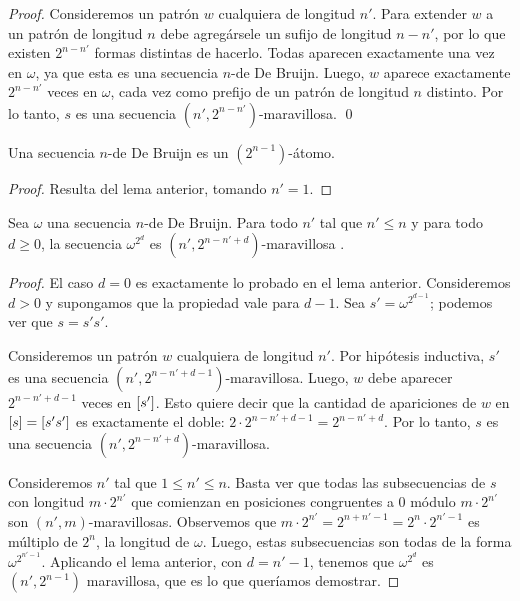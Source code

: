 \documentclass[11pt]{article}
\begin{document}

\begin{proof}
	Consideremos un patrón $w$ cualquiera de longitud $n'$. Para extender $w$ a
	un patrón de longitud $n$ debe agregársele un sufijo de longitud $n-n'$, por
	lo que existen $2^{n-n'}$ formas distintas de hacerlo. Todas
	aparecen exactamente una vez en $\omega$, ya que esta es
	una secuencia $n$-de De Bruijn. Luego, $w$ aparece exactamente $2^{n-n'}$
	veces en $\omega$, cada vez como prefijo de un patrón de longitud $n$
	distinto. Por lo tanto, $s$ es una secuencia $(n',2^{n-n'})$-maravillosa.
	\qed
\end{proof}

\begin{corollary}
	Una secuencia $n$-de De Bruijn es un $(2^{n-1})$-átomo.
\end{corollary}

\begin{proof}
	Resulta del lema anterior, tomando $n' = 1$.
\end{proof}


\begin{lema}
	Sea $\omega$ una secuencia $n$-de De Bruijn.
	Para todo $n'$ tal que $n' \leq n$ y para todo $d \geq 0$, la
	secuencia $\omega^{2^d}$ es $(n',2^{n-n'+d})$-maravillosa .

\end{lema}

\begin{proof}
	El caso $d = 0$ es exactamente lo probado en el lema anterior.
	Consideremos $d > 0$ y supongamos que la propiedad vale para $d - 1$.
	Sea $s' = \omega^{2^{d-1}}$; podemos ver que $s = s's'$.

	Consideremos un patrón $w$ cualquiera de longitud $n'$. Por hipótesis
	inductiva, $s'$ es una secuencia $(n',2^{n-n'+d-1})$-maravillosa. Luego, $w$
	debe aparecer $2^{n-n'+d-1}$ veces en $\left[s'\right]$.
	Esto quiere decir que la cantidad de apariciones de $w$ en $\left[s\right] =
		\left[s's'\right]$ es exactamente el doble: $2 \cdot 2^{n-n'+d-1} = 2^{n-n'+d}$.
	Por lo tanto, $s$ es una secuencia $(n',2^{n-n'+d})$-maravillosa.

	Consideremos $n'$ tal que $1 \leq n' \leq n$. Basta ver que todas las
	subsecuencias de $s$ con longitud $m \cdot 2^{n'}$ que comienzan en
	posiciones congruentes a $0$ módulo $m \cdot 2^{n'}$ son
	$(n',m)$-maravillosas. Observemos que $m \cdot 2^{n'} = 2^{n+n'-1} = 2^n
		\cdot 2^{n'-1}$ es múltiplo de $2^n$, la longitud de $\omega$.
	Luego, estas subsecuencias son todas de la forma $\omega^{2^{n'-1}}$.
	Aplicando el lema anterior, con $d = n'-1$, tenemos que $\omega^{2^d}$
	es $(n',2^{n-1})$ maravillosa, que es lo que queríamos demostrar.
\end{proof}
\end{document}
